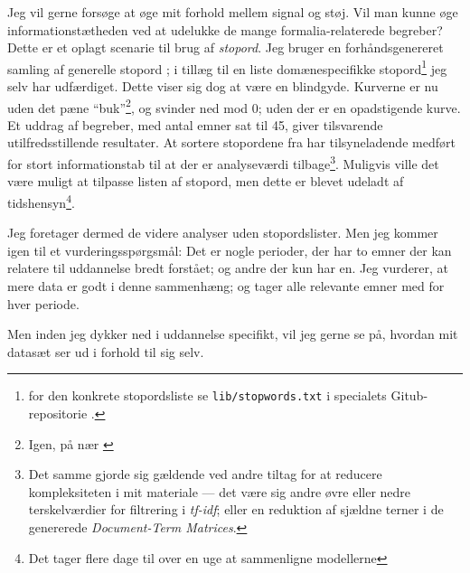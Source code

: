 Jeg vil gerne forsøge at øge mit forhold mellem signal og støj.
Vil man kunne øge informationstætheden ved at udelukke de mange formalia-relaterede begreber?
Dette er et oplagt scenarie til brug af \textit{stopord}.
Jeg bruger en forhåndsgenereret samling af generelle stopord \autocite{stopwords-isoStopwordsISO2020};
i tillæg til en liste domænespecifikke stopord\footnote{
for den konkrete stopordsliste se \texttt{lib/stopwords.txt} i specialets Gitub-repositorie \autocite{andersenNorseghostMasterthesis2020}.}
jeg selv har udfærdiget.
Dette viser sig dog at være en blindgyde.
Kurverne er nu uden det pæne “buk”\footnote{Igen, på nær \autocite{deveaudAccurateEffectiveLatent2014}}, og svinder ned mod 0; uden der er en opadstigende kurve.
Et uddrag af begreber, med antal emner sat til 45, giver tilsvarende utilfredsstillende resultater.
At sortere stopordene fra har tilsyneladende medført for stort informationstab til at der er analyseværdi tilbage\footnote{
Det samme gjorde sig gældende ved andre tiltag for at reducere kompleksiteten i mit materiale —
det være sig andre øvre eller nedre terskelværdier for filtrering i \textit{tf-idf};
eller en reduktion af sjældne terner i de genererede \textit{Document-Term Matrices}.}.
Muligvis ville det være muligt at tilpasse listen af stopord, men dette er blevet udeladt af tidshensyn\footnote{Det tager flere dage til over en uge at sammenligne modellerne}.

Jeg foretager dermed de videre analyser uden stopordslister.
Men jeg kommer igen til et vurderingsspørgsmål:
Det er nogle perioder, der har to emner der kan relatere til uddannelse bredt forstået; og andre der kun har en.
Jeg vurderer, at mere data er godt i denne sammenhæng; og tager alle relevante emner med for hver periode.

Men inden jeg dykker ned i uddannelse specifikt, vil jeg gerne se på, hvordan mit datasæt ser ud i forhold til sig selv.

